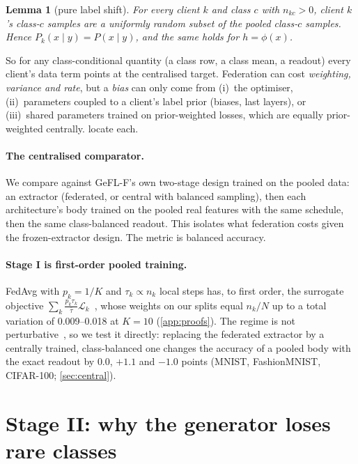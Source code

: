 \documentclass[10pt]{article}
\theoremstyle{plain}
\newtheorem{lemma}[theorem]{Lemma}
\theoremstyle{definition}
\begin{document}
\begin{lemma}[pure label shift]\label{lem:labelshift}
For every client $k$ and class $c$ with $n_{kc}>0$, client $k$'s class-$c$ samples are a uniformly random subset of the
pooled class-$c$ samples. Hence $P_k(x\mid y)=P(x\mid y)$, and the same holds for $h=\phi(x)$.
\end{lemma}

So for any class-conditional quantity (a class row, a class mean, a readout) every client's data term points at the
centralised target. Federation can cost \emph{weighting, variance and rate}, but a \emph{bias} can only come from
(i)~the optimiser, (ii)~parameters coupled to a client's label prior (biases, last layers), or (iii)~shared parameters
trained on prior-weighted losses, which are equally prior-weighted centrally.  locate each.

\paragraph{The centralised comparator.} We compare against GeFL-F's own two-stage design trained on the pooled data:
an extractor (federated, or central with balanced sampling), then each architecture's body trained on the pooled real
features with the same schedule, then the same class-balanced readout. This isolates what federation costs given the
frozen-extractor design. The metric is balanced accuracy.

\paragraph{Stage I is first-order pooled training.} FedAvg with $p_k=1/K$ and $\tau_k\propto n_k$ local steps has, to
first order, the surrogate objective $\sum_k\frac{p_k\tau_k}{\bar\tau}\mathcal L_k$~\cite{wang2020fednova}, whose
weights on our splits equal $n_k/N$ up to a total variation of 0.009--0.018 at $K=10$ (\cref{app:proofs}). The regime
is not perturbative~\cite{charles2021,pathak2020}, so we test it directly: replacing the federated extractor by a centrally trained, class-balanced one changes the accuracy of a pooled
body with the exact readout by $0.0$, $+1.1$ and $-1.0$ points (MNIST, FashionMNIST, CIFAR-100; \cref{sec:central}).

\section{Stage II: why the generator loses rare classes}\label{sec:generator}
\end{document}
